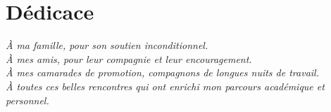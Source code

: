 \chapter*{Dédicace}
\thispagestyle{plain}

\begin{flushright}
\itshape
À ma famille, pour son soutien inconditionnel.\\[0.3cm]
À mes amis, pour leur compagnie et leur encouragement.\\[0.3cm]
À mes camarades de promotion, compagnons de longues nuits de travail.\\[0.3cm]
À toutes ces belles rencontres qui ont enrichi mon parcours académique et personnel.\\[0.3cm]
\end{flushright}
